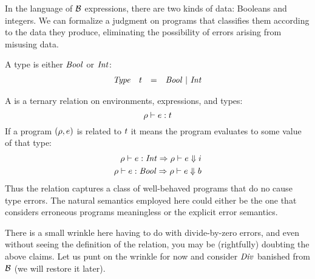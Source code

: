 In the language of $\mathcal{B}$ expressions, there are two kinds of data:
Booleans and integers.  We can formalize a judgment on programs that
classifies them according to the data they produce, eliminating the
possibility of errors arising from misusing data.

A type is either $\mathit{Bool}$ or $\mathit{Int}$:
\[
\begin{array}{llcl}
\mathit{Type} & t & = & \mathit{Bool}\ |\ \mathit{Int}
\end{array}
\]

A  is a ternary relation on environments,
expressions, and types:
\[
{\rho}\vdash{e}:{t}
\]
If a program $(\rho,e)$ is related to $t$ it means the
program evaluates to some value of that type:
\begin{align*}
{\rho}\vdash{e}:{\mathit{Int}} \Rightarrow {\rho} \vdash {e} \Downarrow {i}\\
{\rho}\vdash{e}:{\mathit{Bool}} \Rightarrow {\rho} \vdash {e} \Downarrow {b}
\end{align*}
Thus the relation captures a class of well-behaved programs that do no
cause type errors.  The natural semantics employed here could either
be the one that considers erroneous programs meaningless or the
explicit error semantics.

There is a small wrinkle here having to do with divide-by-zero errors,
and even without seeing the definition of the relation, you may be
(rightfully) doubting the above claims.  Let us punt on the wrinkle
for now and consider $\mathit{Div}$ banished from $\mathcal{B}$ (we will restore
it later).

